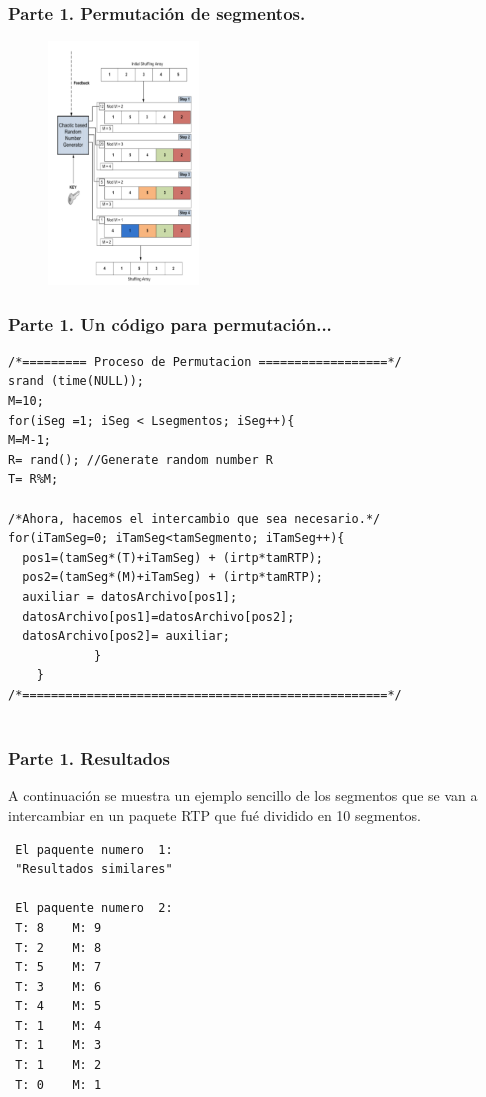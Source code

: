 \documentclass[10pt,fleqn]{beamer}
\begin{document}
{

\begin{frame}
\frametitle{   Parte 1. Permutación de segmentos.   }
\begin{figure}[H]
\centering
\includegraphics[width=4cm]{logos/per.png}
\end{figure}
\end{frame}
}



\begin{frame}[fragile]
\frametitle{Parte 1. Un código para permutación...  }


\begin{lstlisting}
/*========= Proceso de Permutacion ==================*/
srand (time(NULL));
M=10;
for(iSeg =1; iSeg < Lsegmentos; iSeg++){
M=M-1;
R= rand(); //Generate random number R
T= R%M;
		
/*Ahora, hacemos el intercambio que sea necesario.*/
for(iTamSeg=0; iTamSeg<tamSegmento; iTamSeg++){
  pos1=(tamSeg*(T)+iTamSeg) + (irtp*tamRTP);
  pos2=(tamSeg*(M)+iTamSeg) + (irtp*tamRTP);
  auxiliar = datosArchivo[pos1];
  datosArchivo[pos1]=datosArchivo[pos2];
  datosArchivo[pos2]= auxiliar;
	        }
	}
/*===================================================*/
			
\end{lstlisting}
\end{frame}





\begin{frame}[fragile]
\frametitle{Parte 1. Resultados  }

A continuación se muestra un ejemplo sencillo de los segmentos que se van a intercambiar en un paquete RTP que fué dividido en 10 segmentos.


\begin{lstlisting}
 El paquente numero  1:
 "Resultados similares"
 
 El paquente numero  2:
 T: 8    M: 9  
 T: 2    M: 8   
 T: 5    M: 7
 T: 3    M: 6   
 T: 4    M: 5  
 T: 1    M: 4   
 T: 1    M: 3   
 T: 1    M: 2   
 T: 0    M: 1   
\end{lstlisting}
\end{frame}
\end{document}
